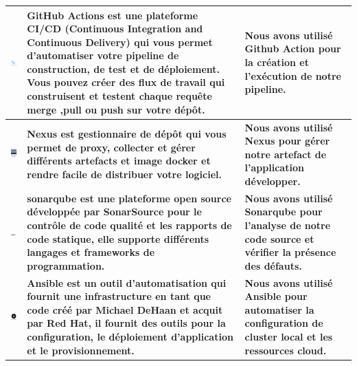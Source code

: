   \begin{center}
    \begin{table}[H]  
      \centering
  \begin{tabular}{|m{5cm}|m{5cm}|m{5cm}|}
  \hline
  \centering\includegraphics[width=3cm,valign=c]{autre_partie/github-actions.png}& \textbf{GitHub Actions est une plateforme CI/CD (Continuous Integration and Continuous Delivery) qui vous permet d'automatiser votre pipeline de construction, de test et de déploiement. Vous pouvez créer des flux de travail qui construisent et testent chaque requête merge ,pull ou push sur votre dépôt.} & \textbf{Nous avons utilisé Github Action  pour la création et l'exécution de notre pipeline.}  \\
  \hline
  \centering\includegraphics[width=3cm,valign=c]{autre_partie/Nexus.png}& \textbf{Nexus est gestionnaire de dépôt qui vous permet de proxy, collecter et gérer différents artefacts et image docker et rendre facile de distribuer votre logiciel. } & \textbf{Nous avons utilisé Nexus pour gérer notre artefact de l'application développer.}  \\
  \hline
  \centering\includegraphics[width=3cm,valign=c]{autre_partie/SONARQ.png}& \textbf{sonarqube est une plateforme open source développée par SonarSource pour le contrôle de code qualité et les rapports de code statique, elle supporte différents langages et frameworks de programmation. } & \textbf{Nous avons utilisé Sonarqube pour l'analyse de notre code source et vérifier la présence des défauts.}  \\
  \hline
  \centering\includegraphics[width=3cm,valign=c]{autre_partie/ANSIBLE.png}& \textbf{Ansible est un outil d’automatisation qui fournit une infrastructure en tant que code créé par Michael DeHaan et acquit par Red Hat, il fournit des outils pour la configuration, le déploiement d’application et le provisionnement. } & \textbf{Nous avons utilisé Ansible pour automatiser la configuration de cluster local et les ressources cloud.}  \\

\end{tabular}
\end{table}
\end{center}

